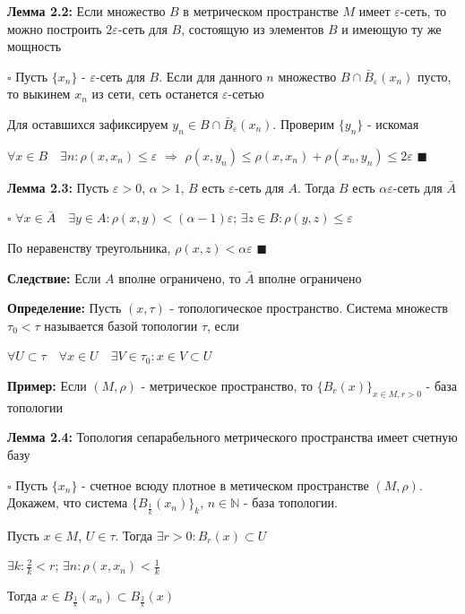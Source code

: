 \documentclass[a4paper]{report}
\begin{document}
\noindent\textbf{Лемма 2.2:} Если множество $B$ в метрическом пространстве $M$ имеет $\varepsilon$-сеть, то можно построить
$2\varepsilon$-сеть для $B$, состоящую из элементов $B$ и имеющую ту же мощность

\noindent $\square$ Пусть $\{x_n\}$ - $\varepsilon$-сеть для $B$. Если для данного $n$ множество $B\cap\bar B_\varepsilon(x_n)$
пусто, то выкинем $x_n$ из сети, сеть останется $\varepsilon$-сетью

Для оставшихся зафиксируем $y_n\in B\cap\bar B_\varepsilon(x_n)$. Проверим $\{y_n\}$ - искомая

$\forall x\in B\quad\exists n\colon\rho(x,x_n)\le\varepsilon$ $\Rightarrow$ $\rho(x,y_n)\le\rho(x,x_n)+\rho(x_n,y_n)
\le 2\varepsilon$ $\blacksquare$
\bigskip

\noindent\textbf{Лемма 2.3:} Пусть $\varepsilon>0$, $\alpha>1$, $B$ есть $\varepsilon$-сеть для $A$. Тогда $B$ есть
$\alpha\varepsilon$-сеть для $\bar A$

\noindent $\square$ $\forall x\in\bar A\quad\exists y\in A\colon\rho(x,y)<(\alpha-1)\varepsilon$;
$\exists z\in B\colon\rho(y,z)\le\varepsilon$

 По неравенству треугольника, $\rho(x,z)<\alpha\varepsilon$ $\blacksquare$
\bigskip


\noindent\textbf{Следствие:} Если $A$ вполне ограничено, то $\bar A$ вполне ограничено
\bigskip

\noindent\textbf{Определение:} Пусть $(x,\tau)$ - топологическое пространство. Система множеств $\tau_0<\tau$ называется базой
топологии $\tau$, если

$\forall U\subset\tau\quad\forall x\in U\quad\exists V\in\tau_0\colon x\in V\subset U$
\bigskip

\noindent\textbf{Пример:} Если $(M,\rho)$ - метрическое пространство, то $\{B_r(x)\}_{x\in M,r>0}$ - база топологии
\bigskip

\noindent\textbf{Лемма 2.4:} Топология сепарабельного метрического пространства имеет счетную базу

\noindent $\square$ Пусть $\{x_n\}$ - счетное всюду плотное в метическом пространстве $(M,\rho)$. Докажем, что система
$\{B_{\frac1k}(x_n)\}_k$, $n\in\mathbb N$ - база топологии.

Пусть $x\in M$, $U\in\tau$. Тогда $\exists r>0\colon B_r(x)\subset U$

$\exists k\colon\frac2k<r$; $\exists n\colon\rho(x,x_n)<\frac1k$

Тогда $x\in B_{\frac1k}(x_n)\subset B_{\frac2k}(x)$
\end{document}
